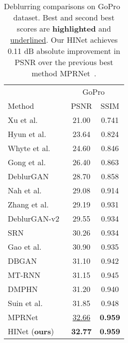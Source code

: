 \documentclass[final]{cvpr}
\newcommand{\tablestyle}[2]{\setlength{\tabcolsep}{#1}\renewcommand{\arraystretch}{#2}\centering\footnotesize}
\begin{document}
\begin{table}
\centering
\tablestyle{5pt}{1.05}\setlength{\tabcolsep}{1.mm}\begin{tabular}{l|cc}
& \multicolumn{2}{|c}{GoPro~\cite{nah2017deep}}\\
Method & PSNR & SSIM\\
\hline
Xu et al.~\cite{xu2013unnatural} & 21.00 & 0.741\\
Hyun et al.~\cite{hyun2013dynamic} & 23.64 & 0.824\\
Whyte et al.~\cite{whyte2012non} & 24.60 & 0.846\\
Gong et al.~\cite{gong2017motion} & 26.40 & 0.863\\
DeblurGAN~\cite{kupyn2018deblurgan}& 28.70 & 0.858\\
Nah et al.~\cite{nah2017deep} & 29.08 & 0.914\\
Zhang et al.~\cite{zhang2018dynamic} & 29.19 & 0.931\\
DeblurGAN-v2~\cite{kupyn2019deblurgan} & 29.55 & 0.934\\
SRN~\cite{tao2018scale} & 30.26 & 0.934\\
Gao et al.~\cite{gao2019dynamic} & 30.90 & 0.935\\
DBGAN~\cite{zhang2020deblurring} & 31.10 & 0.942\\
MT-RNN~\cite{park2020multi} & 31.15 & 0.945\\
DMPHN~\cite{Zhang_2019_CVPR} & 31.20 & 0.940\\
Suin et al.~\cite{suin2020spatially} & 31.85 & 0.948\\
MPRNet~\cite{Zamir2021MPRNet} & \underline{32.66} & \textbf{0.959}\\
\hline
HINet (\textbf{ours}) & \textbf{32.77} & \textbf{0.959}\\
\end{tabular}
\vspace{-0.2cm}
\caption{Deblurring comparisons on GoPro~\cite{nah2017deep} dataset. Best and second best scores are \textbf{highlighted} and \underline{underlined}. Our HINet achieves 0.11 dB absolute improvement in PSNR over the previous best method MPRNet~\cite{Zamir2021MPRNet}.}
\label{tab.GoPro.results}
\vspace{-0.4cm}
\end{table}
\end{document}
